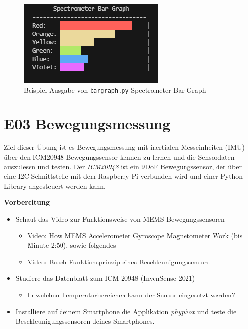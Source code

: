 \documentclass[
  11pt,
  a4paper,
  oneside, openany  ,captions=tableheading
]{scrbook}
\providecommand{\tightlist}{%
  \setlength{\itemsep}{0pt}\setlength{\parskip}{0pt}}
\theoremstyle{remark}
\begin{document}
\begin{figure}[H]

{\centering \includegraphics{images/as7262_bargraph.png}

}

\caption{Beispiel Ausgabe von \texttt{bargraph.py} Spectrometer Bar
Graph}

\end{figure}%

\chapter*{E03 Bewegungsmessung}\label{e03-bewegungsmessung}


Ziel dieser Übung ist es Bewegungsmessung mit inertialen Messeinheiten
(IMU) über den ICM20948 Bewegungssensor kennen zu lernen und
die Sensordaten auszulesen und testen. Der \emph{ICM20948} ist ein 9DoF
Bewegungssensor, der über eine I2C Schnittstelle mit dem Raspberry Pi
verbunden wird und einer Python Library angesteuert werden kann.

\textbf{Vorbereitung}

\begin{itemize}
\tightlist
\item
  Schaut das Video zur Funktionsweise von MEMS Bewegungssensoren

  \begin{itemize}
  \tightlist
  \item
    Video:
    \href{https://www.youtube.com/embed/eqZgxR6eRjo?si=u28t9yfD4BLPeYGd}{How
    MEMS Accelerometer Gyroscope Magnetometer Work} (bis Minute 2:50),
    sowie folgendes
  \item
    Video:
    \href{https://www.youtube.com/embed/swCTbz5sIQM?si=Uga2sPKfiQW7EO6z}{Bosch
    Funktionsprinzip eines Beschleunigungssensors}
  \end{itemize}
\item
  Studiere das Datenblatt zum ICM-20948 (InvenSense 2021)

  \begin{itemize}
  \tightlist
  \item
    In welchen Temperaturbereichen kann der Sensor eingesetzt werden?
  \end{itemize}
\item
  Installiere auf deinem Smartphone die Applikation
  \emph{\href{https://phyphox.org}{phyphox}} und teste die
  Beschleunigungssensoren deines Smartphones.
\end{itemize}
\end{document}
